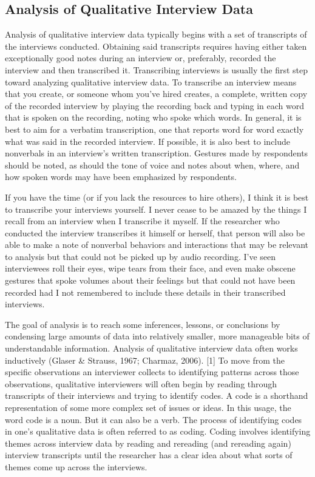 \subsection{Analysis of Qualitative Interview Data}

Analysis of qualitative interview data typically begins with a set of transcripts of the interviews conducted. Obtaining said transcripts requires having either taken exceptionally good notes during an interview or, preferably, recorded the interview and then transcribed it. Transcribing interviews is usually the first step toward analyzing qualitative interview data. To transcribe an interview means that you create, or someone whom you’ve hired creates, a complete, written copy of the recorded interview by playing the recording back and typing in each word that is spoken on the recording, noting who spoke which words. In general, it is best to aim for a verbatim transcription, one that reports word for word exactly what was said in the recorded interview. If possible, it is also best to include nonverbals in an interview’s written transcription. Gestures made by respondents should be noted, as should the tone of voice and notes about when, where, and how spoken words may have been emphasized by respondents.

If you have the time (or if you lack the resources to hire others), I think it is best to transcribe your interviews yourself. I never cease to be amazed by the things I recall from an interview when I transcribe it myself. If the researcher who conducted the interview transcribes it himself or herself, that person will also be able to make a note of nonverbal behaviors and interactions that may be relevant to analysis but that could not be picked up by audio recording. I’ve seen interviewees roll their eyes, wipe tears from their face, and even make obscene gestures that spoke volumes about their feelings but that could not have been recorded had I not remembered to include these details in their transcribed interviews.

The goal of analysis is to reach some inferences, lessons, or conclusions by condensing large amounts of data into relatively smaller, more manageable bits of understandable information. Analysis of qualitative interview data often works inductively (Glaser \& Strauss, 1967; Charmaz, 2006). [1] To move from the specific observations an interviewer collects to identifying patterns across those observations, qualitative interviewers will often begin by reading through transcripts of their interviews and trying to identify codes. A code is a shorthand representation of some more complex set of issues or ideas. In this usage, the word code is a noun. But it can also be a verb. The process of identifying codes in one’s qualitative data is often referred to as coding. Coding involves identifying themes across interview data by reading and rereading (and rereading again) interview transcripts until the researcher has a clear idea about what sorts of themes come up across the interviews.

